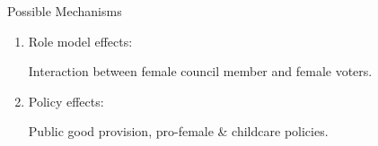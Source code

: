 \documentclass[
  10pt,
  ignorenonframetext,
  aspectratio=43,
]{beamer}
\begin{document}
\begin{frame}{Possible Mechanisms}
\protect\hypertarget{possible-mechanisms}{}
\begin{enumerate}
\item
  Role model effects:

  Interaction between female council member and female voters.
\item
  Policy effects:

  Public good provision, pro-female \& childcare policies.
\end{enumerate}
\end{frame}
\end{document}
